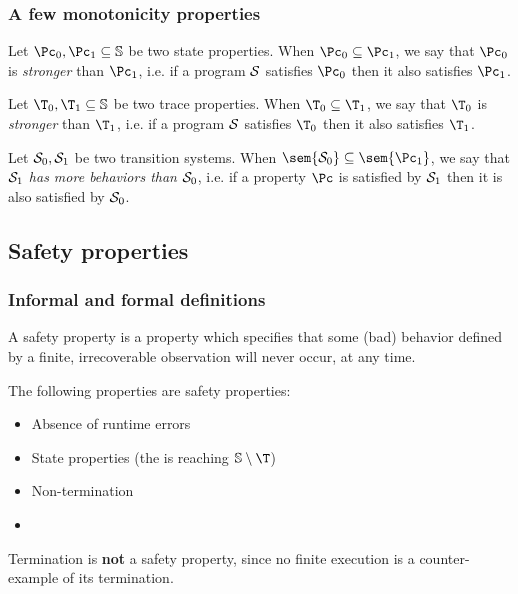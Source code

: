 \documentclass[toc, titlepaged]{../cs-classes/cs-classes}
\begin{document}
\subsubsection{A few monotonicity properties}
\begin{property}
    Let $\Pc_0, \Pc_1 \subseteq \S$ be two state properties. When $\Pc_0\subseteq\Pc_1$, we say that $\Pc_0$ is \emph{stronger} than $\Pc_1$, i.e. if a program $\mathcal{S}$ satisfies $\Pc_0$ then it also satisfies $\Pc_1$.
\end{property}

\begin{property}
    Let $\T_0, \T_1 \subseteq \S$ be two trace properties. When $\T_0\subseteq\T_1$, we say that $\T_0$ is \emph{stronger} than $\T_1$, i.e. if a program $\mathcal{S}$ satisfies $\T_0$ then it also satisfies $\T_1$.
\end{property}

\begin{property}
    Let $\mathcal{S}_0, \mathcal{S}_1$ be two transition systems. When $\sem{\Sc_0}\subseteq\sem{\Pc_1}$, we say that $\mathcal{S}_1$ \emph{has more behaviors than} $\mathcal{S}_0$, i.e. if a property $\Pc$ is satisfied by $\mathcal{S}_1$ then it is also satisfied by $\mathcal{S}_0$.
\end{property}

\subsection{Safety properties}
\subsubsection{Informal and formal definitions}
\begin{definition}
    A safety property is a property which specifies that some (bad) behavior defined by a finite, irrecoverable observation will never occur, at any time.
\end{definition}
\begin{example}
    The following properties are safety properties:
    \begin{itemize}
        \item Absence of runtime errors
        \item State properties (the  is reaching $\S\setminus\T$)
        \item Non-termination 
        \item {}
    \end{itemize}
    Termination is \textbf{not} a safety property, since no finite execution is a counter-example of its termination.
\end{example}
\end{document}
